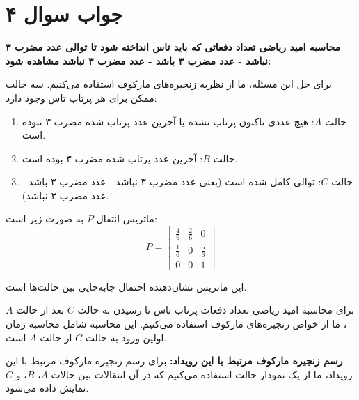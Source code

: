 \section*{جواب سوال ۴}

\textbf{محاسبه امید ریاضی تعداد دفعاتی که باید تاس انداخته شود تا توالی عدد مضرب ۳ نباشد - عدد مضرب ۳ باشد - عدد مضرب ۳ نباشد مشاهده شود:}

برای حل این مسئله، ما از نظریه زنجیره‌های مارکوف استفاده می‌کنیم. سه حالت ممکن برای هر پرتاب تاس وجود دارد:

\begin{enumerate}
	\item حالت \(A\): هیچ عددی تاکنون پرتاب نشده یا آخرین عدد پرتاب شده مضرب ۳ نبوده است.
	\item حالت \(B\): آخرین عدد پرتاب شده مضرب ۳ بوده است.
	\item حالت \(C\): توالی کامل شده است (یعنی عدد مضرب ۳ نباشد - عدد مضرب ۳ باشد - عدد مضرب ۳ نباشد).
\end{enumerate}

ماتریس انتقال \(P\) به صورت زیر است:
\[ P = \begin{bmatrix}
	\frac{4}{6} & \frac{2}{6} & 0 \\
	\frac{1}{6} & 0 & \frac{5}{6} \\
	0 & 0 & 1
\end{bmatrix} \]

این ماتریس نشان‌دهنده احتمال جابه‌جایی بین حالت‌ها است.

برای محاسبه امید ریاضی تعداد دفعات پرتاب تاس تا رسیدن به حالت \(C\) بعد از حالت \(A\)، ما از خواص زنجیره‌های مارکوف استفاده می‌کنیم. این محاسبه شامل محاسبه زمان اولین ورود به حالت \(C\) از حالت \(A\) است.

\textbf{رسم زنجیره مارکوف مرتبط با این رویداد:}
برای رسم زنجیره مارکوف مرتبط با این رویداد، ما از یک نمودار حالت استفاده می‌کنیم که در آن انتقالات بین حالات \(A\)، \(B\)، و \(C\) نمایش داده می‌شود.
